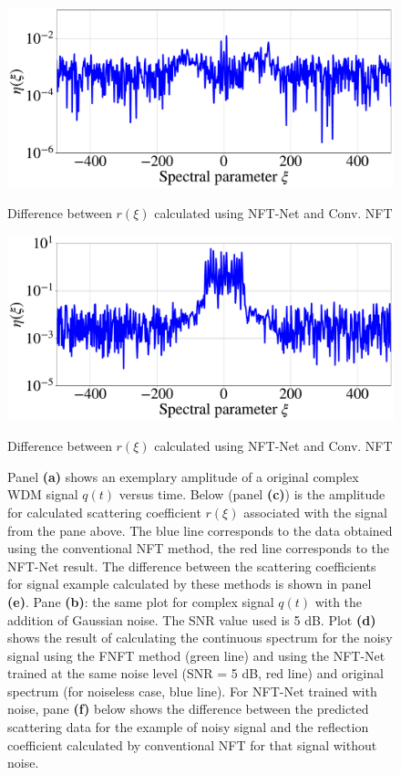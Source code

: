 \begin{figure}[htbp]
\begin{minipage}{.47\textwidth}
  \centering
  \includegraphics[width=1.\linewidth]{images/nn_nft/scirep_spectrum_diff_example.pdf}
  \caption{Difference between $r(\xi)$ calculated using NFT-Net and Conv. NFT}
  \label{fig:won_diff}
\end{minipage}
\hfill
\begin{minipage}{.47\textwidth}
  \centering
  \includegraphics[width=1.\linewidth]{images/nn_nft/scirep_spectrum_diff_wn_example.pdf}
  \caption{Difference between $r(\xi)$ calculated using NFT-Net and Conv. NFT}
  \label{fig:wn_diff}
\end{minipage}


\caption{Panel \textbf{(a)} shows an exemplary amplitude of a original complex WDM signal $q(t)$ versus time. Below (panel \textbf{(c)}) is the amplitude for calculated scattering coefficient $r(\xi)$ associated with the signal from the pane above. The blue line corresponds to the data obtained using the conventional NFT method, the red line corresponds to the NFT-Net result. The difference between the scattering coefficients for signal example calculated by these methods is shown in panel \textbf{(e)}. Pane \textbf{(b)}: the same plot for complex signal $q(t)$ with the addition of Gaussian noise. The SNR value used is 5 dB. Plot \textbf{(d)} shows the result of calculating the continuous spectrum for the noisy signal using the FNFT method (green line) and using the NFT-Net trained at the same noise level (SNR = 5 dB, red line) and original spectrum (for noiseless case, blue line). For NFT-Net trained with noise, pane \textbf{(f)} below shows the difference between the predicted scattering data for the example of noisy signal and the reflection coefficient calculated by conventional NFT for that signal without noise.}
\label{fig:wdm_and_spectrum}
\end{figure}


